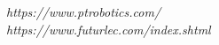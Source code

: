 {\it https://www.ptrobotics.com/} \\
{\it https://www.futurlec.com/index.shtml} \\








\newpage


















\newpage
